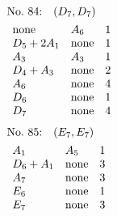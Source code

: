 %
%
\begin{align*}
&\hbox to 4cm {\textrm{No.~84:}\quad$(D_{7}, D_{7})$\hss}\\ 
&\begin{array}{lll}
\none & A_{6} & 1\\
D_{5}+2A_{1} & \none & 1\\
A_{3} & A_{3} & 1\\
D_{4}+A_{3} & \none & 2\\
A_{6} & \none & 4\\
D_{6} & \none & 1\\
D_{7} & \none & 4\\
\end{array}
\end{align*}
%
%
\begin{align*}
&\hbox to 4cm {\textrm{No.~85:}\quad$(E_{7}, E_{7})$\hss}\\ 
&\begin{array}{lll}
A_{1} & A_{5} & 1\\
D_{6}+A_{1} & \none & 3\\
A_{7} & \none & 3\\
E_{6} & \none & 1\\
E_{7} & \none & 3\\
\end{array}
\end{align*}
%
%
%
